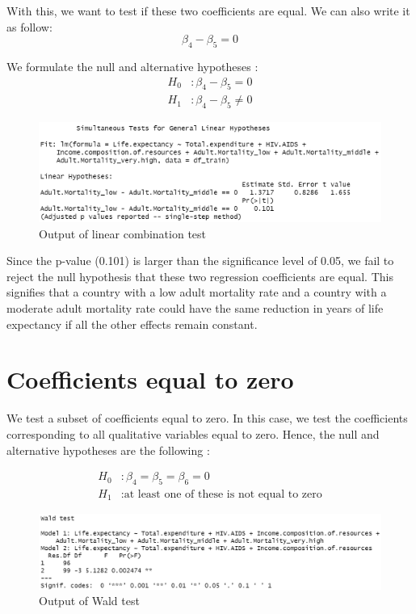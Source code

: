  With this, we want to test if these two coefficients are equal. We can also write it as follow: \begin{equation*}
     \beta_4 - \beta_5 = 0
 \end{equation*}

We formulate the null and alternative hypotheses : 
\begin{align*}
	H_0&: \beta_4 - \beta_5 = 0 \\
	H_1&: \beta_4 - \beta_5 \neq 0
\end{align*}

\begin{figure}[H]
	\centering
	\includegraphics{figures/hypothesis_testing/linear_combination_of_coeff.PNG}
	\caption{Output of linear combination test}
\end{figure}

Since the p-value (0.101) is larger than the significance level of 0.05, we fail to reject the null hypothesis that these two regression coefficients are equal. This signifies that a country with a low adult mortality rate and a country with a moderate adult mortality rate could have the same reduction in years of life expectancy if all the other effects remain constant. 

\section{Coefficients equal to zero}

We test a subset of coefficients equal to zero. In this case, we test the coefficients corresponding to all qualitative variables equal to zero. Hence, the null and alternative hypotheses are the following :

\begin{align*}
	H_0&: \beta_4 = \beta_5 = \beta_6 = 0 \\
	H_1&: \text{at least one of these is not equal to zero}
\end{align*}

\begin{figure}[H]
	\centering
	\includegraphics{figures/hypothesis_testing/wald_test_subset_coeff_zero.PNG}
	\caption{Output of Wald test}
\end{figure}

